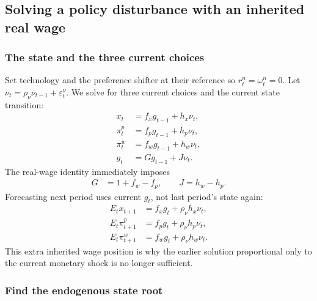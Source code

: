 \subsection{Solving a policy disturbance with an inherited real wage}

\subsubsection{The state and the three current choices}

Set technology and the preference shifter at their reference so
$r_t^n=\omega_t^n=0$. Let
$\nu_t=\rho_\nu\nu_{t-1}+\varepsilon_t^\nu$.
We solve for three current choices and the current state transition:
\begin{align}
 x_t&=f_xg_{t-1}+h_x\nu_t,\\
 \pi_t^p&=f_pg_{t-1}+h_p\nu_t,\\
 \pi_t^w&=f_wg_{t-1}+h_w\nu_t,\\
 g_t&=Gg_{t-1}+J\nu_t.
 \label{eq:sw-linear-policies}
\end{align}
The real-wage identity immediately imposes
\begin{align}
 G&=1+f_w-f_p,\qquad J=h_w-h_p.
\end{align}
Forecasting next period uses current $g_t$, not last period's state again:
\begin{align}
 E_tx_{t+1}&=f_xg_t+\rho_\nu h_x\nu_t,\\
 E_t\pi_{t+1}^p&=f_pg_t+\rho_\nu h_p\nu_t,\\
 E_t\pi_{t+1}^w&=f_wg_t+\rho_\nu h_w\nu_t.
\end{align}
This extra inherited wage position is why the earlier solution proportional
only to the current monetary shock is no longer sufficient.

\subsubsection{Find the endogenous state root}

